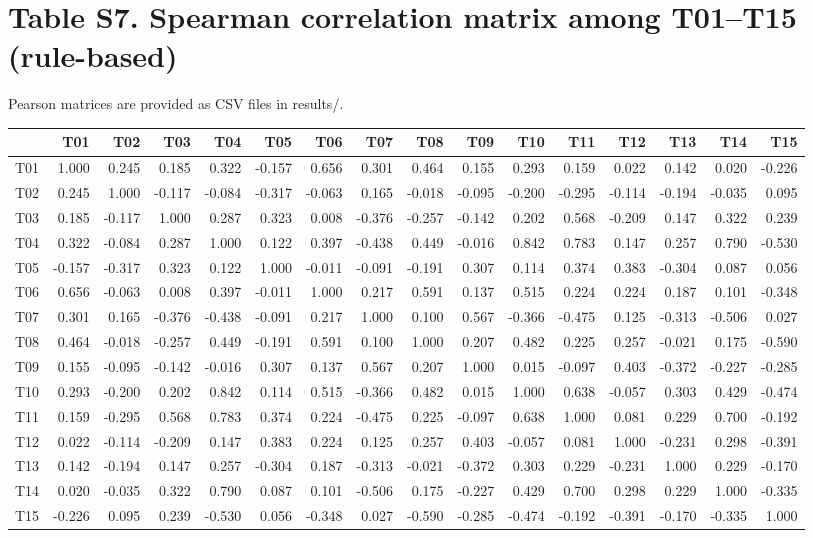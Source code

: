 \documentclass[10pt]{article}
\begin{document}
\section*{Table S7. Spearman correlation matrix among T01--T15 (rule-based)}
Pearson matrices are provided as CSV files in results/.

{\scriptsize\setlength{\tabcolsep}{3pt}\begin{longtable}{lrrrrrrrrrrrrrrr}
\toprule
 & T01 & T02 & T03 & T04 & T05 & T06 & T07 & T08 & T09 & T10 & T11 & T12 & T13 & T14 & T15 \\
\midrule
\endhead
T01 & 1.000 & 0.245 & 0.185 & 0.322 & -0.157 & 0.656 & 0.301 & 0.464 & 0.155 & 0.293 & 0.159 & 0.022 & 0.142 & 0.020 & -0.226 \\
T02 & 0.245 & 1.000 & -0.117 & -0.084 & -0.317 & -0.063 & 0.165 & -0.018 & -0.095 & -0.200 & -0.295 & -0.114 & -0.194 & -0.035 & 0.095 \\
T03 & 0.185 & -0.117 & 1.000 & 0.287 & 0.323 & 0.008 & -0.376 & -0.257 & -0.142 & 0.202 & 0.568 & -0.209 & 0.147 & 0.322 & 0.239 \\
T04 & 0.322 & -0.084 & 0.287 & 1.000 & 0.122 & 0.397 & -0.438 & 0.449 & -0.016 & 0.842 & 0.783 & 0.147 & 0.257 & 0.790 & -0.530 \\
T05 & -0.157 & -0.317 & 0.323 & 0.122 & 1.000 & -0.011 & -0.091 & -0.191 & 0.307 & 0.114 & 0.374 & 0.383 & -0.304 & 0.087 & 0.056 \\
T06 & 0.656 & -0.063 & 0.008 & 0.397 & -0.011 & 1.000 & 0.217 & 0.591 & 0.137 & 0.515 & 0.224 & 0.224 & 0.187 & 0.101 & -0.348 \\
T07 & 0.301 & 0.165 & -0.376 & -0.438 & -0.091 & 0.217 & 1.000 & 0.100 & 0.567 & -0.366 & -0.475 & 0.125 & -0.313 & -0.506 & 0.027 \\
T08 & 0.464 & -0.018 & -0.257 & 0.449 & -0.191 & 0.591 & 0.100 & 1.000 & 0.207 & 0.482 & 0.225 & 0.257 & -0.021 & 0.175 & -0.590 \\
T09 & 0.155 & -0.095 & -0.142 & -0.016 & 0.307 & 0.137 & 0.567 & 0.207 & 1.000 & 0.015 & -0.097 & 0.403 & -0.372 & -0.227 & -0.285 \\
T10 & 0.293 & -0.200 & 0.202 & 0.842 & 0.114 & 0.515 & -0.366 & 0.482 & 0.015 & 1.000 & 0.638 & -0.057 & 0.303 & 0.429 & -0.474 \\
T11 & 0.159 & -0.295 & 0.568 & 0.783 & 0.374 & 0.224 & -0.475 & 0.225 & -0.097 & 0.638 & 1.000 & 0.081 & 0.229 & 0.700 & -0.192 \\
T12 & 0.022 & -0.114 & -0.209 & 0.147 & 0.383 & 0.224 & 0.125 & 0.257 & 0.403 & -0.057 & 0.081 & 1.000 & -0.231 & 0.298 & -0.391 \\
T13 & 0.142 & -0.194 & 0.147 & 0.257 & -0.304 & 0.187 & -0.313 & -0.021 & -0.372 & 0.303 & 0.229 & -0.231 & 1.000 & 0.229 & -0.170 \\
T14 & 0.020 & -0.035 & 0.322 & 0.790 & 0.087 & 0.101 & -0.506 & 0.175 & -0.227 & 0.429 & 0.700 & 0.298 & 0.229 & 1.000 & -0.335 \\
T15 & -0.226 & 0.095 & 0.239 & -0.530 & 0.056 & -0.348 & 0.027 & -0.590 & -0.285 & -0.474 & -0.192 & -0.391 & -0.170 & -0.335 & 1.000 \\
\bottomrule
\end{longtable}}
\end{document}
